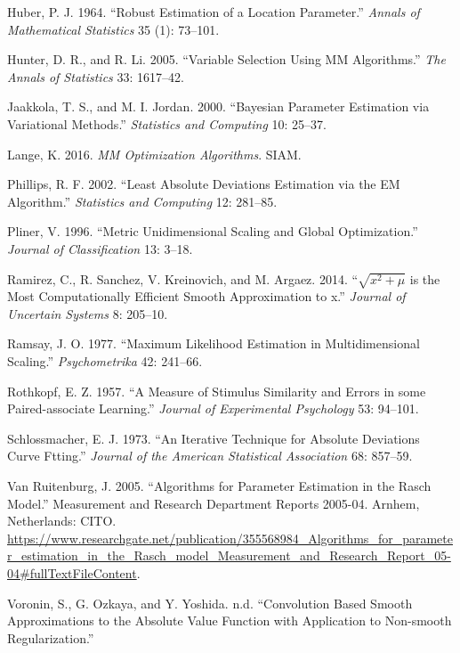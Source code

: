 \documentclass[
  12pt,
  letterpaper,
  DIV=11,
  numbers=noendperiod]{scrartcl}
\newlength{\cslhangindent}
\newenvironment{CSLReferences}[2] %
 {\begin{list}{}{%
  \setlength{\itemindent}{0pt}
  \setlength{\leftmargin}{0pt}
  \setlength{\parsep}{0pt}
  \ifodd #1
   \setlength{\leftmargin}{\cslhangindent}
   \setlength{\itemindent}{-1\cslhangindent}
  \fi
  \setlength{\itemsep}{#2\baselineskip}}}
 {\end{list}}
\theoremstyle{plain}
\theoremstyle{remark}
\begin{document}
\begin{CSLReferences}{1}{0}
Huber, P. J. 1964. {``Robust Estimation of a Location Parameter.''}
\emph{Annals of Mathematical Statistics} 35 (1): 73--101.

Hunter, D. R., and R. Li. 2005. {``{Variable Selection Using MM
Algorithms}.''} \emph{The Annals of Statistics} 33: 1617--42.

Jaakkola, T. S., and M. I. Jordan. 2000. {``{Bayesian Parameter
Estimation via Variational Methods}.''} \emph{Statistics and Computing}
10: 25--37.

Lange, K. 2016. \emph{MM Optimization Algorithms}. SIAM.

Phillips, R. F. 2002. {``Least Absolute Deviations Estimation via the EM
Algorithm.''} \emph{Statistics and Computing} 12: 281--85.

Pliner, V. 1996. {``{Metric Unidimensional Scaling and Global
Optimization}.''} \emph{Journal of Classification} 13: 3--18.

Ramirez, C., R. Sanchez, V. Kreinovich, and M. Argaez. 2014.
{``{\(\sqrt{x^2+\mu}\) is the Most Computationally Efficient Smooth
Approximation to \vert{}x\vert{}}.''} \emph{Journal of Uncertain
Systems} 8: 205--10.

Ramsay, J. O. 1977. {``{Maximum Likelihood Estimation in
Multidimensional Scaling}.''} \emph{Psychometrika} 42: 241--66.

Rothkopf, E. Z. 1957. {``{A Measure of Stimulus Similarity and Errors in
some Paired-associate Learning}.''} \emph{Journal of Experimental
Psychology} 53: 94--101.

Schlossmacher, E. J. 1973. {``An Iterative Technique for Absolute
Deviations Curve Ftting.''} \emph{Journal of the American Statistical
Association} 68: 857--59.

Van Ruitenburg, J. 2005. {``{Algorithms for Parameter Estimation in the
Rasch Model}.''} Measurement and Research Department Reports 2005-04.
Arnhem, Netherlands: CITO.
\url{https://www.researchgate.net/publication/355568984_Algorithms_for_parameter_estimation_in_the_Rasch_model_Measurement_and_Research_Report_05-04\#fullTextFileContent}.

Voronin, S., G. Ozkaya, and Y. Yoshida. n.d. {``{Convolution Based
Smooth Approximations to the Absolute Value Function with Application to
Non-smooth Regularization}.''}

\end{CSLReferences}
\end{document}
